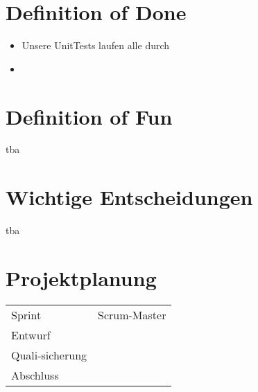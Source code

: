 \documentclass[titlepage]{scrartcl}
\begin{document}
\section{Definition of Done}%
\begin{itemize}
	\item Unsere UnitTests laufen alle durch
	\item 
\end{itemize}
\section{Definition of Fun}%
tba
\section{Wichtige Entscheidungen}
tba
\section{Projektplanung}%
\begin{tabular}{lc}
	Sprint & Scrum-Master\\
	Entwurf & \\
	Quali-sicherung & \\
	Abschluss & \\
\end{tabular}
\end{document}

